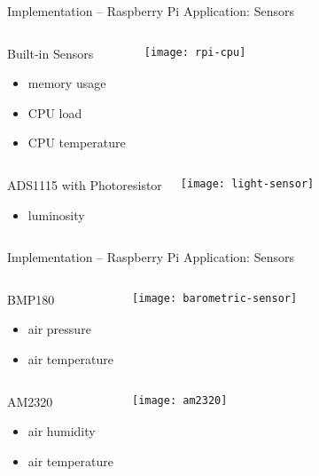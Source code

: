 \begin{frame}{Implementation -- Raspberry Pi Application: Sensors}
  \begin{columns}
    \begin{block}{Built-in Sensors}
      \begin{itemize}
        \item memory usage
        \item CPU load
        \item CPU temperature
      \end{itemize}
    \end{block}

    \vfill
    \centering
    \texttt{[image: rpi-cpu]}
  \end{columns}

  \begin{columns}
    \begin{block}{ADS1115 with Photoresistor}
      \begin{itemize}
          \item luminosity
      \end{itemize}
    \end{block}

    \vfill
    \centering
    \texttt{[image: light-sensor]}
  \end{columns}
\end{frame}

\begin{frame}{Implementation -- Raspberry Pi Application: Sensors}
  \begin{columns}
    \begin{block}{BMP180}
      \begin{itemize}
        \item air pressure
        \item air temperature
      \end{itemize}
    \end{block}

    \vfill
    \centering
    \texttt{[image: barometric-sensor]}
  \end{columns}

  \begin{columns}
    \begin{block}{AM2320}
      \begin{itemize}
        \item air humidity
        \item air temperature
      \end{itemize}
    \end{block}

    \vfill
    \centering
    \texttt{[image: am2320]}
  \end{columns}
\end{frame}

